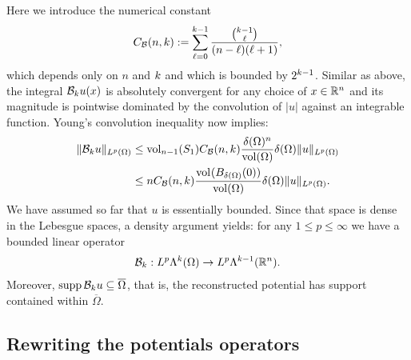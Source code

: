 \documentclass[10pt,a4paper]{article}
\begin{document}
Here we introduce the numerical constant 
\begin{gather}\label{equation:A_Bogov}
    C_{{\mathcal B}}(n,k) := \sum_{\ell=0}^{k-1} \frac{ \tbinom{k-1}{\ell} }{ (n-\ell)(\ell+1) }, 
\end{gather}
which depends only on $n$ and $k$ and which is bounded by $2^{k-1}$. 
Similar as above,
the integral ${\mathcal B}_{k} u(x)$ is absolutely convergent for any choice of $x \in {\mathbb R}^{n}$
and its magnitude is pointwise dominated by the convolution of $|u|$ against an integrable function.
Young's convolution inequality now implies: 
\begin{align*}
    \| {\mathcal B}_{k} u \|_{L^{p}(\Omega)}
    &
    \leq 
    \operatorname{vol}_{n-1}(S_1) C_{{\mathcal B}}(n,k) \frac{ {\delta}(\Omega)^{n} }{\operatorname{vol}(\Omega)} 
    {\delta}(\Omega)
    \| u \|_{L^{p}(\Omega)}
    \\&
    \leq 
    n C_{{\mathcal B}}(n,k) \frac{ \operatorname{vol}_{}(B_{{\delta}(\Omega)}(0)) }{\operatorname{vol}(\Omega)} 
    {\delta}(\Omega)
    \| u \|_{L^{p}(\Omega)}
    .
\end{align*}
We have assumed so far that $u$ is essentially bounded.
Since that space is dense in the Lebesgue spaces, a density argument yields: 
for any $1 \leq p \leq \infty$ we have a bounded linear operator 
\begin{gather*}
    {\mathcal B}_{k} : L^{p}\Lambda^{k}(\Omega) \rightarrow L^{p}\Lambda^{k-1}({\mathbb R}^n).
\end{gather*}
Moreover, $\operatorname{supp} {\mathcal B}_{k} u \subseteq \overline\Omega$,
that is, the reconstructed potential has support contained within $\overline\Omega$. 





\subsection{Rewriting the potentials operators}
\end{document}
